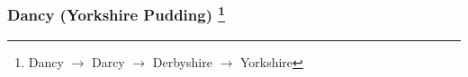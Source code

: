 \documentclass[10pt]{article}
\newcommand{\hozline}[0]{%
  \noindent\hdashrule[0.5ex][c]{\textwidth}{.1pt}{}
}
\begin{document}










\newpage

\hozline

\subsubsection*{Dancy \hfill (Yorkshire Pudding)\nolinebreak
\footnote{Dancy \(\to\) Darcy \(\to\) Derbyshire \(\to\) Yorkshire}}
\label{sec:dancy}
\end{document}
